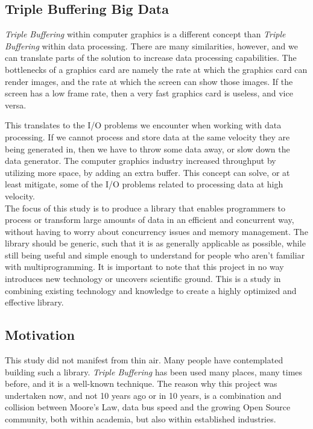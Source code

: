\documentclass[a4paper]{article}
\begin{document}
\subsection{Triple Buffering Big Data}
\textit{Triple Buffering} within computer graphics is a different concept than \textit{Triple Buffering} within data processing. There are many similarities, however, and we can translate parts of the solution to increase data processing capabilities. The bottlenecks of a graphics card are namely the rate at which the graphics card can render images, and the rate at which the screen can show those images. If the screen has a low frame rate, then a very fast graphics card is useless, and vice versa. 

This translates to the I/O problems we encounter when working with data processing. If we cannot process and store data at the same velocity they are being generated in, then we have to throw some data away, or slow down the data generator. The computer graphics industry increased throughput by utilizing more space, by adding an extra buffer. This concept can solve, or at least mitigate, some of the I/O problems related to processing data at high velocity.\\

The focus of this study is to produce a library that enables programmers to process or transform large amounts of data in an efficient and concurrent way, without having to worry about concurrency issues and memory management. The library should be generic, such that it is as generally applicable as possible, while still being useful and simple enough to understand for people who aren't familiar with multiprogramming. It is important to note that this project in no way introduces new technology or uncovers scientific ground. This is a study in combining existing technology and knowledge to create a highly optimized and effective library.


\subsection{Motivation}
This study did not manifest from thin air. Many people have contemplated building such a library. \textit{Triple Buffering} has been used many places, many times before, and it is a well-known technique. The reason why this project was undertaken now, and not 10 years ago or in 10 years, is a combination and collision between Moore's Law, data bus speed and the growing Open Source community, both within academia, but also within established industries. 
\end{document}
